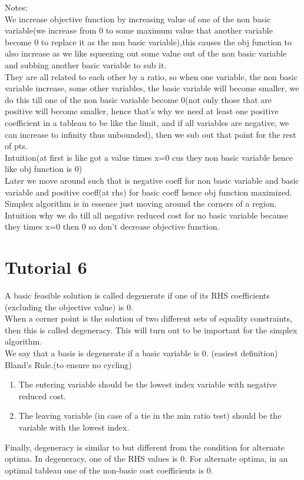\documentclass{article}
\begin{document}
Notes:\\
We increase objective function by increasing value of one of the non basic variable(we increase from 0 to some maximum value that another variable become 0 to replace it as the non basic variable),this causes the obj function to also increase as we like squeezing out some value out of the non basic variable and subbing another basic variable to sub it.\\
They are all related to each other by a ratio, so when one variable, the non basic variable increase, some other variables, the basic variable will become smaller, we do this till one of the non basic variable become 0(not only those that are positive will become smaller, hence that's why we need at least one positive coefficient in a tableau to be like the limit, and if all variables are negative, we can increase to infinity thus unbounded), then we sub out that point for the rest of pts.\\
Intuition(at first is like got a value times x=0 cus they non basic variable hence like obj function is 0)\\
Later we move around such that is negative coeff for non basic variable and basic variable and positive coeff(at rhs) for basic coeff hence obj function maximized.\\
Simplex algorithm is in essence just moving around the corners of a region.\\
Intuition why we do till all negative reduced cost for no basic variable because they times x=0 then 0 so don't decrease objective function.\\
\section{Tutorial 6}
A basic feasible solution is called degenerate if one of its RHS coefficients (excluding the objective value) is 0.\\
When a corner point is the solution of two different sets of equality constraints, then this is called degeneracy.  This will turn out to be important for the simplex algorithm.\\
We say that a basis is degenerate if a basic variable is 0. (easiest definition)\\
Bland’s Rule.(to ensure no cycling)
\begin{enumerate}
  \item The entering variable should be the lowest index variable with negative reduced cost.
  \item The leaving variable (in case of a tie in the min ratio test) should be the variable with the lowest index.

\end{enumerate}
Finally, degeneracy is similar to but different from the condition for alternate optima.  In degeneracy, one of the RHS values is 0.  For alternate optima, in an optimal tableau one of the non-basic cost coefficients is 0.
\end{document}
